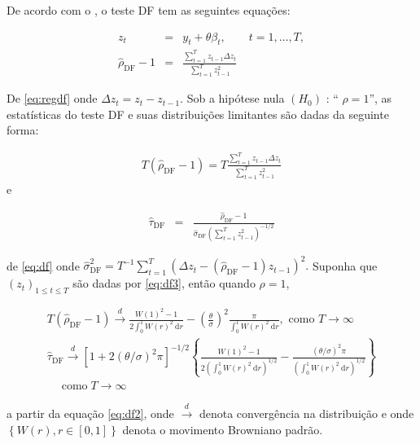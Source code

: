 De acordo com o , o teste DF tem as seguintes equações:

\begin{eqnarray}
	z_t&=& y_t+\theta \beta_t, \qquad t=1,\ldots, T, \label{eq:df3}\\	
	\hat{\rho}_{\mathrm{DF}}-1&=&\frac{\sum_{t=1}^T z_{t-1} \Delta z_t}{\sum_{t=1}^T z_{t-1}^2} \label{eq:regdf}
\end{eqnarray}

De \eqref{eq:regdf} onde $\Delta z_t=z_t-z_{t-1}$. Sob a hipótese nula $\left(H_0\right)$ : `` $\rho=1$'', as estatísticas do teste DF e suas distribuições limitantes são dadas da seguinte forma:


\begin{eqnarray}
	T\left(\hat{\rho}_{\mathrm{DF}}-1\right)=T \frac{\sum_{t=1}^T z_{t-1} \Delta z_t}{\sum_{t=1}^T z_{t-1}^2}
\end{eqnarray}
e


\begin{eqnarray}
	\hat{\tau}_{\mathrm{DF}}&=&\frac{\hat{\rho}_{\mathrm{DF}}-1}{\hat{\sigma}_{\mathrm{DF}}\left(\sum_{t=1}^T z_{t-1}^2\right)^{-1 / 2}} \label{eq:df}
\end{eqnarray}

\noindent de \eqref{eq:df} onde $\hat{\sigma}_{\mathrm{DF}}^2=T^{-1} \sum_{t=1}^T\left(\Delta z_t-\left(\hat{\rho}_{\mathrm{DF}}-1\right) z_{t-1}\right)^2 .$
Suponha que $\left(z_t\right)_{1 \leq t \leq T}$ são dadas por \eqref{eq:df3}, então quando $\rho=1$,


\begin{eqnarray}
	T\left(\hat{\rho}_{\mathrm{DF}}-1\right) \stackrel{d}{\longrightarrow} \frac{W(1)^2-1}{2 \int_0^1 W(r)^2 \mathrm{~d} r}-\left(\frac{\theta}{\sigma}\right)^2 \frac{\pi}{\int_0^1 W(r)^2 \mathrm{~d} r}, \text { como } T \rightarrow \infty \\
	\hat{\tau}_{\mathrm{DF}} \stackrel{d}{\longrightarrow}\left[1+2(\theta / \sigma)^2 \pi\right]^{-1 / 2}\left\{\frac{W(1)^2-1}{2\left(\int_0^1 W(r)^2 \mathrm{~d} r\right)^{1 / 2}}-\frac{(\theta / \sigma)^2 \pi}{\left(\int_0^1 W(r)^2 \mathrm{~d} r\right)^{1 / 2}}\right\} \\
	\quad \operatorname{como} T \rightarrow \infty\label{eq:df2}
\end{eqnarray}

\noindent a partir da equação \eqref{eq:df2}, onde $\stackrel{d}{\longrightarrow}$ denota convergência na distribuição e onde $\left\{W(r), r \in[0,1]\right\}$ denota o movimento Browniano padrão.

